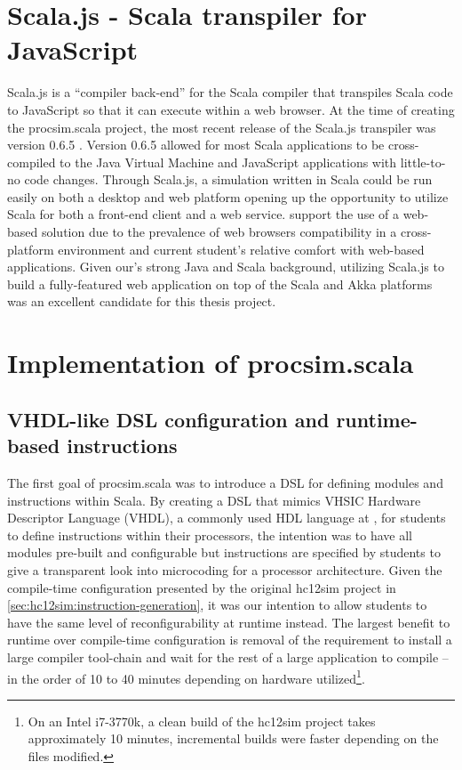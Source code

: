 \section{Scala.js - Scala transpiler for JavaScript}

Scala.js is a ``compiler back-end'' for the Scala compiler that transpiles Scala code to JavaScript so that it can execute within a web browser. At the time of creating the procsim.scala project, the most recent release of the Scala.js transpiler was version 0.6.5 \cite{Scala-js2015}. Version 0.6.5 allowed for most Scala applications to be cross-compiled to the Java Virtual Machine and JavaScript applications with little-to-no code changes. Through Scala.js, a simulation written in Scala could be run easily on both a desktop and web platform opening up the opportunity to utilize Scala for both a front-end client and a web service.  support the use of a web-based solution due to the prevalence of web browsers compatibility in a cross-platform environment and current student's relative comfort with web-based applications. Given our's strong Java and Scala background, utilizing Scala.js to build a fully-featured web application on top of the Scala and Akka platforms was an excellent candidate for this thesis project.

\section{Implementation of procsim.scala}

\subsection{VHDL-like DSL configuration and runtime-based instructions}
\label{sec:sec:procsim-scala:configuration}

The first goal of procsim.scala was to introduce a DSL for defining modules and instructions within Scala. By creating a DSL that mimics VHSIC Hardware Descriptor Language (VHDL), a commonly used HDL language at \uwo{}, for students to define instructions within their processors, the intention was to have all modules pre-built and configurable but instructions are specified by students to give a transparent look into microcoding for a processor architecture. Given the compile-time configuration presented by the original hc12sim project in \cref{sec:hc12sim:instruction-generation}, it was our intention to allow students to have the same level of reconfigurability at runtime instead. The largest benefit to runtime over compile-time configuration is removal of the requirement to install a large compiler tool-chain and wait for the rest of a large application to compile -- in the order of 10 to 40 minutes depending on hardware utilized\footnote{On an Intel\textregistered{} i7-3770k, a clean build of the hc12sim project takes approximately 10 minutes, incremental builds were faster depending on the files modified.}. 

